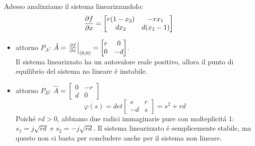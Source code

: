 \documentclass[../main.tex]{subfiles}
\begin{document}
		\noindent
		Adesso analizziamo il sistema linearizzandolo:
		\[ 
			\frac{\partial f}{\partial x} = 
			\begin{bmatrix}
				r(1-x_2) & -r x_1
				\\
				d x_2 & d(x_1-1)
			\end{bmatrix}
		\]
		\begin{itemize}
			\item
				attorno $ P_A $: $ \hat A = \left. \frac{\partial f}{\partial x} \right|_{(0,0)} = \begin{bmatrix} r & 0\\ 0 & -d \end{bmatrix} $.\\
				Il sistema linearizzato ha un autovalore reale positivo, allora il punto di equilibrio del sistema no lineare \'e instabile.
			\item
				attorno $ P_B $: $ \hat A = \begin{bmatrix} 0 & -r\\ d & 0 \end{bmatrix} $
				\[ 
					\varphi(s) = det \begin{bmatrix} s & r\\ -d & s \end{bmatrix} = s^2 + rd 
				\]
				Poich\'e $ rd > 0 $, abbiamo due radici immaginarie pure con molteplicit\'a $ 1 $: $ s_1 = j\sqrt{rd} $ e $ s_2 = -j\sqrt{rd} $. Il sistema linearizzato \'e semplicemente stabile, ma questo non ci basta per concludere anche per il sistema non lineare.
		\end{itemize}
\end{document}

